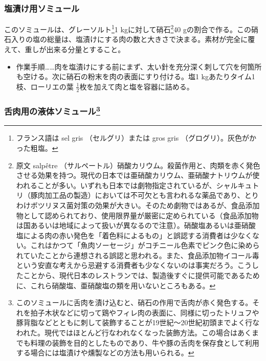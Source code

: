 
 
\begin{recette}
\hypertarget{saumure-au-sel}{%
\subsubsection{塩漬け用ソミュール}\label{saumure-au-sel}}



このソミュールは、グレーソルト\footnote{フランス語は sel gris
  （セルグリ）または gros gris （グログリ）。灰色がかった粗塩。}1
kgに対して硝石\footnote{原文 salpêtre
  （サルペートル）硝酸カリウム。殺菌作用と、肉類を赤く発色させる効果を持つ。現代の日本では亜硝酸カリウム、亜硝酸ナトリウムが使われることが多い。いずれも日本では劇物指定されているが、シャルキュトリ（豚肉加工品の製造）においては不可欠とも言われるな薬品であり、とりわけボツリヌス菌対策の効果が大きい。そのため劇物ではあるが、食品添加物として認められており、使用限界量が厳密に定められている（食品添加物は国あるいは地域によって扱いが異なるので注意）。硝酸塩あるいは亜硝酸塩による肉の赤い発色を「着色料によるもの」と誤認する消費者は少なくない。これはかつて「魚肉ソーセージ」がコチニール色素でピンク色に染められていたことから連想される誤認と思われる。また、食品添加物イコール毒という安直な考えから忌避する消費者も少なくないのは事実だろう。こうしたことから、現代日本のレストランでは、製造後すぐに提供可能であるために、これら硝酸塩、亜硝酸塩の類を用いないところもある。}40
gの割合で作る。この硝石入りの塩の総量は、塩漬けにする肉の数と大きさで決まる。素材が完全に覆えて、重しが出来る分量とすること。

\begin{itemize}
\tightlist
\item
  作業手順\ldots{}\ldots{}肉を塩漬けにする前にまず、太い針を充分深く刺して穴を何箇所も空ける。次に硝石の粉末を肉の表面にすり付ける。塩1
  kgあたりタイム1枝、ローリエの葉
  \(\frac{1}{2}\)枚を加えて肉と塩を容器に詰める。
\end{itemize}

\hypertarget{saumure-liquide-pour-langues}{%
\subsubsection[舌肉用の液体ソミュール]{\texorpdfstring{舌肉用の液体ソミュール\footnote{このソミュールに舌肉を漬け込むと、硝石の作用で舌肉が赤く発色する。それを拍子木状などに切って鶏やフィレ肉の表面に、同様に切ったトリュフや豚背脂などとともに刺して装飾することが19世紀〜20世紀初頭までよく行なわれた。現代ではほとんど行なわれなくなった装飾方法。この場合はあくまでも料理の装飾を目的としたものであり、牛や豚の舌肉を保存食として利用する場合には塩漬けや燻製などの方法も用いられる。}}{舌肉用の液体ソミュール}}\label{saumure-liquide-pour-langues}}


\end{recette}

